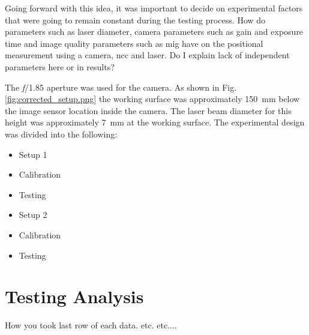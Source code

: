 \noindent Going forward with this idea, it was important to decide on experimental factors that were going to remain constant during the testing process. How do parameters such as laser diameter, camera parameters such as gain and exposure time and image quality parameters such as \gls{mig} have on the positional measurement using a camera, \gls{ncc} and laser. Do I explain lack of independent parameters here or in results?

\vspace{5mm}

\noindent The \emph{f}/1.85 aperture was used for the camera. As shown in Fig. \ref{fig:corrected_setup.png} the working surface was approximately \SI{150}{\milli\meter} below the image sensor location inside the camera. The laser beam diameter for this height was approximately \SI{7}{\milli\meter} at the working surface. The experimental design was divided into the following:
\begin{itemize}
    \item Setup 1
    \item Calibration
    \item Testing
    \item Setup 2
    \item Calibration
    \item Testing
\end{itemize}

\section{Testing Analysis}
How you took last row of each data. etc. etc....

